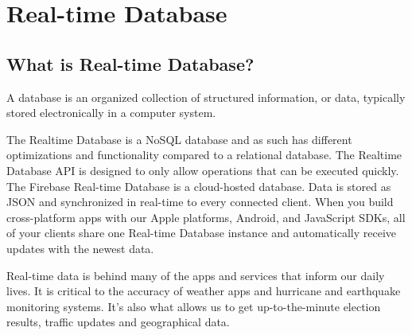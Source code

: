 \documentclass[12pt,a4paper]{report}
\begin{document}
\chapter{\fontsize{18}{0}\selectfont Real-time Database}
\section{{\fontsize{16}{0}\selectfont What is Real-time Database?}}
{\fontsize{14}{0}\selectfont
\noindent
A database is an organized collection of structured information, or data, typically stored electronically in a computer system.

\hspace{1cm}The Realtime Database is a NoSQL database and as such has different optimizations and functionality compared to a relational database. The Realtime Database API is designed to only allow operations that can be executed quickly. The Firebase Real-time Database is a cloud-hosted database. Data is stored as \ac{JSON} and synchronized in real-time to every connected client. When you build cross-platform apps with our Apple platforms, Android, and JavaScript \ac{SDK}s, all of your clients share one Real-time Database instance and automatically receive updates with the newest data.

\hspace{1cm}Real-time data is behind many of the apps and services that inform our daily lives. It is critical to the accuracy of weather apps and hurricane and earthquake monitoring systems. It's also what allows us to get up-to-the-minute election results, traffic updates and geographical data.

}
\newpage
\end{document}

